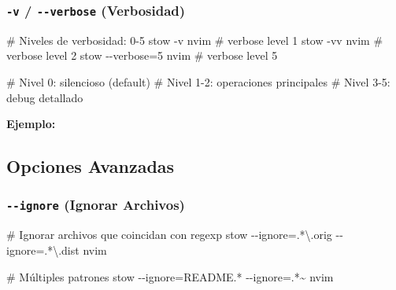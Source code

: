\documentclass[
  doc,
  floatsintext,
  longtable,
  a4paper,
  nolmodern,
  notxfonts,
  notimes,
  12pt,
  colorlinks=true,linkcolor=blue,citecolor=blue,urlcolor=blue]{apa7}
\newenvironment{Shaded}{\begin{snugshade}}{\end{snugshade}}
\newcommand{\AttributeTok}[1]{\textcolor[rgb]{0.40,0.45,0.13}{#1}}
\newcommand{\CommentTok}[1]{\textcolor[rgb]{0.37,0.37,0.37}{#1}}
\newcommand{\ExtensionTok}[1]{\textcolor[rgb]{0.00,0.23,0.31}{#1}}
\newcommand{\NormalTok}[1]{\textcolor[rgb]{0.00,0.23,0.31}{#1}}
\newcommand{\OperatorTok}[1]{\textcolor[rgb]{0.37,0.37,0.37}{#1}}
\newcommand{\StringTok}[1]{\textcolor[rgb]{0.13,0.47,0.30}{#1}}
\begin{document}
\subsubsection{\texorpdfstring{\texttt{-v} / \texttt{-\/-verbose}
(Verbosidad)}{-v / -\/-verbose (Verbosidad)}}\label{v---verbose-verbosidad}

\begin{Shaded}
\begin{Highlighting}[]
\CommentTok{\# Niveles de verbosidad: 0{-}5}
\ExtensionTok{stow} \AttributeTok{{-}v}\NormalTok{ nvim          }\CommentTok{\# verbose level 1}
\ExtensionTok{stow} \AttributeTok{{-}vv}\NormalTok{ nvim         }\CommentTok{\# verbose level 2}
\ExtensionTok{stow} \AttributeTok{{-}{-}verbose}\OperatorTok{=}\NormalTok{5 nvim }\CommentTok{\# verbose level 5}

\CommentTok{\# Nivel 0: silencioso (default)}
\CommentTok{\# Nivel 1{-}2: operaciones principales}
\CommentTok{\# Nivel 3{-}5: debug detallado}
\end{Highlighting}
\end{Shaded}

\textbf{Ejemplo:}

\begin{Shaded}
\end{Shaded}

\subsection{Opciones Avanzadas}\label{opciones-avanzadas}

\subsubsection{\texorpdfstring{\texttt{-\/-ignore} (Ignorar
Archivos)}{-\/-ignore (Ignorar Archivos)}}\label{ignore-ignorar-archivos}

\begin{Shaded}
\begin{Highlighting}[]
\CommentTok{\# Ignorar archivos que coincidan con regexp}
\ExtensionTok{stow} \AttributeTok{{-}{-}ignore}\OperatorTok{=}\StringTok{\textquotesingle{}.*\textbackslash{}.orig\textquotesingle{}} \AttributeTok{{-}{-}ignore}\OperatorTok{=}\StringTok{\textquotesingle{}.*\textbackslash{}.dist\textquotesingle{}}\NormalTok{ nvim}

\CommentTok{\# Múltiples patrones}
\ExtensionTok{stow} \AttributeTok{{-}{-}ignore}\OperatorTok{=}\StringTok{\textquotesingle{}README.*\textquotesingle{}} \AttributeTok{{-}{-}ignore}\OperatorTok{=}\StringTok{\textquotesingle{}.*\textasciitilde{}\textquotesingle{}}\NormalTok{ nvim}
\end{Highlighting}
\end{Shaded}
\end{document}

